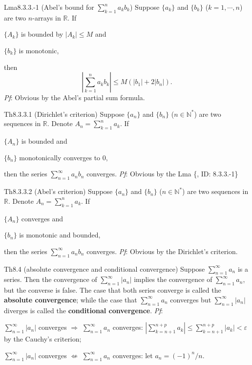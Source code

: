 \documentclass{article}
\begin{document}
\begin{Th}{Lma8.3.3.-1 (Abel's bound for $\sum_{k=1}^{n} a_k b_k$)}
    Suppose $\{a_k\}$ and $\{b_k\}$ ($k=1,\cdots,n$) are two $n$-arrays in $\mathbb{R}$. If
    \begin{compactenum}
        \item $\{A_k\}$ is bounded by $|A_k|\leq M$ and
        \item $\{b_k\}$ is monotonic,
    \end{compactenum}
    then
    $$ \left|\sum_{k=1}^{n} a_k b_k\right| \leq M(|b_1|+2|b_n|). $$
    \tcblower
    \textit{Pf}: Obvious by the Abel's partial sum formula.
\end{Th}

\begin{Th}{Th8.3.3.1 (Dirichlet's criterion)}
    Suppose $\{a_n\}$ and $\{b_n\}$ ($n\in\mathbb{N}^\ast$) are two sequences in $\mathbb{R}$. Denote $A_n = \sum_{k=1}^{n} a_k$. If
    \begin{compactenum}
        \item $\{A_n\}$ is bounded and
        \item $\{b_n\}$ monotonically converges to $0$,
    \end{compactenum}
    then the series $\sum_{n=1}^{\infty} a_n b_n$ converges.
    \tcblower
    \textit{Pf}: Obvious by the Lma \{, ID: 8.3.3.-1\}
\end{Th}

\begin{Th}{Th8.3.3.2 (Abel's criterion)}
    Suppose $\{a_n\}$ and $\{b_n\}$ ($n\in\mathbb{N}^\ast$) are two sequences in $\mathbb{R}$. Denote $A_n = \sum_{k=1}^{n} a_k$. If
    \begin{compactenum}
        \item $\{A_n\}$ converges and
        \item $\{b_n\}$ is monotonic and bounded,
    \end{compactenum}
    then the series $\sum_{n=1}^{\infty} a_n b_n$ converges.
    \tcblower
    \textit{Pf}: Obvious by the Dirichlet's criterion.
\end{Th}

\begin{Th}{Th8.4 (absolute convergence and conditional convergence)}
    Suppose $\sum_{n=1}^{\infty} a_n$ is a series. Then the convergence of $\sum_{n=1}^{\infty} |a_n|$ implies the convergence of $\sum_{n=1}^{\infty} a_n$, but the converse is false. \textcolor{Df}{The case that both series converge is called the \textbf{absolute convergence}; while the case that $\sum_{n=1}^{\infty} a_n$ converges but $\sum_{n=1}^{\infty} |a_n|$ diverges is called the \textbf{conditional convergence}}.
    \tcblower
    \textit{Pf}: 
    \begin{compactenum}
        \item $\sum_{n=1}^{\infty} |a_n|$ converges $\Rightarrow$ $\sum_{n=1}^{\infty} a_n $ converges: $|\sum_{k=n+1}^{n+p} a_k| \leq \sum_{k=n+1}^{n+p} |a_k| < \varepsilon$ by the Cauchy's criterion;
        \item $\sum_{n=1}^{\infty} |a_n|$ converges $\nLeftarrow$ $\sum_{n=1}^{\infty} a_n $ converges: let $a_n = (-1)^n/n$.
    \end{compactenum}
\end{Th}
\end{document}
